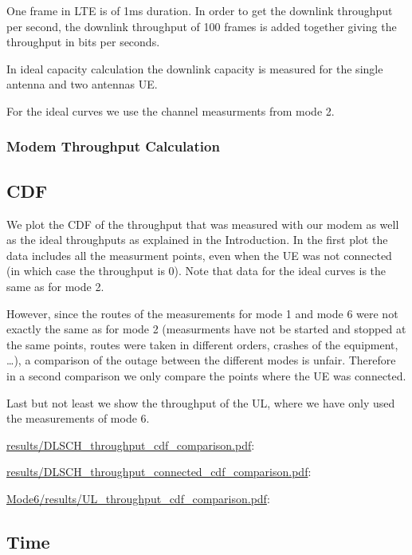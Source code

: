 \documentclass[a4paper,10pt]{article}
\newcommand{\printfile}[2][]{
 \begin{minipage}{8cm}
  \centering
  \url{#2}: #1

 \end{minipage}
}
\begin{document}
One frame in LTE is of 1ms duration. In order to get the downlink throughput per second, the downlink throughput of 100 frames is added together giving the throughput in bits per seconds.

In ideal capacity calculation the downlink capacity is measured for the single antenna and two antennas UE.  

For the ideal curves we use the channel measurments from mode 2.

\subsubsection{Modem Throughput Calculation}



\subsection{CDF}


We plot the CDF of the throughput that was measured with our modem as well as the ideal throughputs as explained in the Introduction. In the first plot the data includes all the measurment points, even when the UE was not connected (in which case the throughput is 0). Note that data for the ideal curves is the same as for mode 2. 

However, since the routes of the measurements for mode 1 and mode 6 were not exactly the same as for mode 2 (measurments have not be started and stopped at the same points, routes were taken in different orders, crashes of the equipment, \ldots), a comparison of the outage between the different modes is unfair. Therefore in a second comparison we only compare the points where the UE was connected. 

Last but not least we show the throughput of the UL, where we have only used the measurements of mode 6.

\printfile{results/DLSCH_throughput_cdf_comparison.pdf}
\printfile{results/DLSCH_throughput_connected_cdf_comparison.pdf}

\printfile{Mode6/results/UL_throughput_cdf_comparison.pdf}


\subsection{Time}
\end{document}
